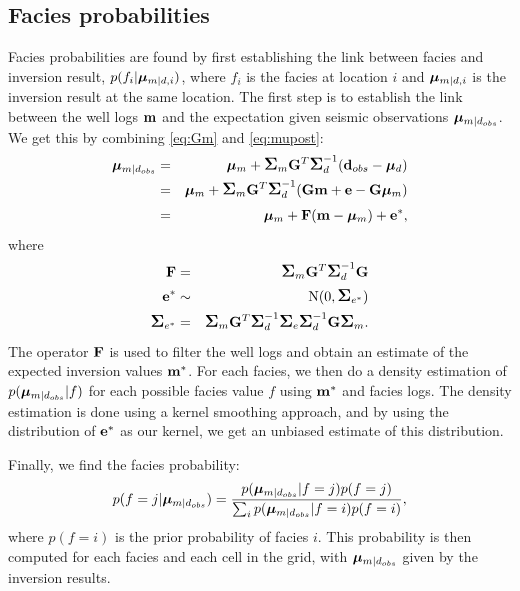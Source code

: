 \subsection{Facies probabilities}
\label{sec:facprobthe}
Facies probabilities are found by first establishing the link between
facies and inversion result, $p(f_i|\bm\mu_{m|d,i})$, where $f_i$ is the
facies at location $i$ and $\bm\mu_{m|d,i}$ is the inversion result at
the same location. The first step is to establish the link between the
well logs $\mathbf{m}$ and the expectation given seismic observations
$\bm\mu_{m|d_{obs}}$. We get this by combining \autoref{eq:Gm} and
\autoref{eq:mupost}: 
\begin{eqnarray}
\bm\mu_{m|d_{obs}} &=&\bm\mu_{m} +\mbox{\large\ensuremath{\boldsymbol{\Sigma}}}_{m}\mathbf{G}^T \mbox{\large\ensuremath{\boldsymbol{\Sigma}}}_{d}^{-1}
                           (\mathbf{d}_{obs}-\bm\mu_{d}) \nonumber \\
& = & \bm\mu_{m} +\mbox{\large\ensuremath{\boldsymbol{\Sigma}}}_{m}\mathbf{G}^T \mbox{\large\ensuremath{\boldsymbol{\Sigma}}}_{d}^{-1}
                           (\mathbf{G}\mathbf{m}+\mathbf{e}-\mathbf{G}\bm\mu_m) \nonumber\\
& = & \bm\mu_m + \mathbf{F}(\mathbf{m}-\bm\mu_m)+\mathbf{e}^*,
\end{eqnarray}
where
\begin{eqnarray}
\mathbf{F} & = &\mbox{\large\ensuremath{\boldsymbol{\Sigma}}}_{m}\mathbf{G}^T \mbox{\large\ensuremath{\boldsymbol{\Sigma}}}_{d}^{-1}\mathbf{G} \\
\mathbf{e}^* & \sim & \text{N}(0,\mbox{\large\ensuremath{\boldsymbol{\Sigma}}}_{e^*}) \\
\mbox{\large\ensuremath{\boldsymbol{\Sigma}}}_{e^*} & = & \mbox{\large\ensuremath{\boldsymbol{\Sigma}}}_{m}\mathbf{G}^T \mbox{\large\ensuremath{\boldsymbol{\Sigma}}}_{d}^{-1}\mbox{\large\ensuremath{\boldsymbol{\Sigma}}}_e\mbox{\large\ensuremath{\boldsymbol{\Sigma}}}_{d}^{-1}\mathbf{G}\mbox{\large\ensuremath{\boldsymbol{\Sigma}}}_m.
\end{eqnarray}
The operator $\mathbf{F}$ is used to filter the well logs and obtain an
estimate of the expected inversion values $\mathbf{m}^\ast$. For each
facies, we then do a density estimation of $p(\bm\mu_{m|d_{obs}}|f)$ for
each possible facies value $f$ using $\mathbf{m}^\ast$ and facies
logs. The density estimation is done using a kernel smoothing
approach, and by using the distribution of $\mathbf{e}^*$ as our kernel,
we get an unbiased estimate of this distribution. 

Finally, we find the facies probability:
\begin{equation}
p(f=j|\bm\mu_{m|d_{obs}}) = \frac{p(\bm\mu_{m|d_{obs}}|f=j)p(f=j)}{\sum_i p(\bm\mu_{m|d_{obs}}|f=i)p(f=i)},
\end{equation}
where $p(f=i)$ is the prior probability of facies $i$. This
probability is then computed for each facies and each cell in the
grid, with $\bm\mu_{m|d_{obs}}$ given by the inversion results.


